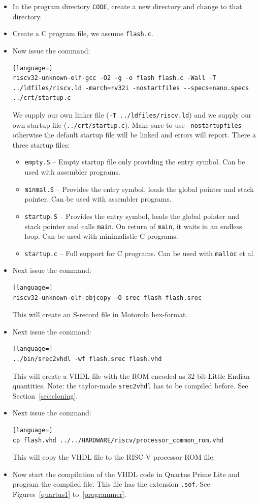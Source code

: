 \documentclass[12pt]{article}
\begin{document}
\begin{itemize}
\item In the program directory \lstinline|CODE|, create a new directory and change to that directory.
\item Create a C program file, we assume \lstinline|flash.c|.
\item Now issue the command:
\begin{lstlisting}[language=]
riscv32-unknown-elf-gcc -O2 -g -o flash flash.c -Wall -T ../ldfiles/riscv.ld -march=rv32i -nostartfiles --specs=nano.specs ../crt/startup.c
\end{lstlisting}
We supply our own linker file (\lstinline|-T ../ldfiles/riscv.ld|) and we supply our own startup file (\lstinline|../crt/startup.c|). Make sure to use \lstinline|-nostartupfiles| otherwise the default startup file will be linked and errors will report. There a three startup files:
\begin{itemize}
\item \texttt{empty.S} -- Empty startup file only providing the entry symbol. Can be used with assembler programs.
\item \texttt{minmal.S} -- Provides the entry symbol, loads the global pointer and stack pointer. Can be used with assembler programs.
\item \texttt{startup.S} -- Provides the entry symbol, loads the global pointer and stack pointer and calls \texttt{main}. On return of \texttt{main}, it waits in an endless loop. Can be used with minimalistic C programs.
\item \texttt{startup.c} -- Full support for C programs. Can be used with \texttt{malloc} et al.
\end{itemize}
\item Next issue the command:
\begin{lstlisting}[language=]
riscv32-unknown-elf-objcopy -O srec flash flash.srec
\end{lstlisting}
This will create an S-record file in Motorola hex-format.
\item Next issue the command:
\begin{lstlisting}[language=]
../bin/srec2vhdl -wf flash.srec flash.vhd
\end{lstlisting}
This will create a VHDL file with the ROM encoded as 32-bit Little Endian quantities. Note: the taylor-made \texttt{srec2vhdl} has to be compiled before. See Section~\ref{sec:cloning}.
\item Next issue the command:
\begin{lstlisting}[language=]
cp flash.vhd ../../HARDWARE/riscv/processor_common_rom.vhd
\end{lstlisting}
This will copy the VHDL file to the RISC-V processor ROM file.
\item Now start the compilation of the VHDL code in Quartus Prime Lite and program the compiled file. This file has the extension \lstinline|.sof|. See Figures~\ref{quartus1} to~\ref{programmer}.


\end{itemize}
\end{document}
